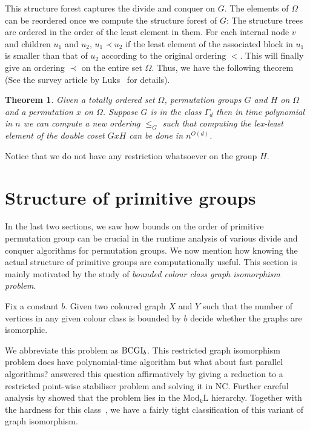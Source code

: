 \documentclass{article}
\newtheorem{theorem}{Theorem}[section]
\begin{document}
This structure forest captures the divide and conquer on $G$. The
elements of $\Omega$ can be reordered once we compute the structure
forest of $G$: The structure trees are ordered in the order of the
least element in them. For each internal node $v$ and children $u_1$
and $u_2$, $u_1 \prec u_2$ if the least element of the associated
block in $u_1$ is smaller than that of $u_2$ according to the original
ordering $<$. This will finally give an ordering $\prec$ on the entire
set $\Omega$. Thus, we have the following theorem (See the survey
article by Luks~\cite{luks93permutation} for details).

\begin{theorem}
  Given a totally ordered set $\Omega$, permutation groups $G$ and $H$
  on $\Omega$ and a permutation $x$ on $\Omega$. Suppose $G$ is in the
  class $\Gamma_d$ then in time polynomial in $n$ we can compute a new
  ordering $\leq_G$ such that computing the lex-least element of the
  double coset $GxH$ can be done in $n^{O(d)}$.
\end{theorem}

Notice that we do not have any restriction whatsoever on the group
$H$.

\section{Structure of primitive groups}

In the last two sections, we saw how bounds on the order of primitive
permutation group can be crucial in the runtime analysis of various
divide and conquer algorithms for permutation groups. We now mention
how knowing the actual structure of primitive groups are
computationally useful. This section is mainly motivated by the study
of \emph{bounded colour class graph isomorphism problem}.

\begin{problem}
  Fix a constant $b$. Given two coloured graph $X$ and $Y$ such that
  the number of vertices in any given colour class is bounded by $b$
  decide whether the graphs are isomorphic.
\end{problem}

We abbreviate this problem as $\mathrm{BCGI}_{b}$. This restricted graph
isomorphism problem does have polynomial-time algorithm but what about
fast parallel algorithms?  \citet{luks86parallel} answered this
question affirmatively by giving a reduction to a restricted
point-wise stabiliser problem and solving it in NC. Further careful
analysis by \citet{arvind2005bounded} showed that the problem lies in
the $\mathrm{Mod}_k\mathrm{L}$ hierarchy. Together with the hardness
for this class~\cite{toran2004hardness}, we have a fairly tight
classification of this variant of graph isomorphism.
\end{document}
